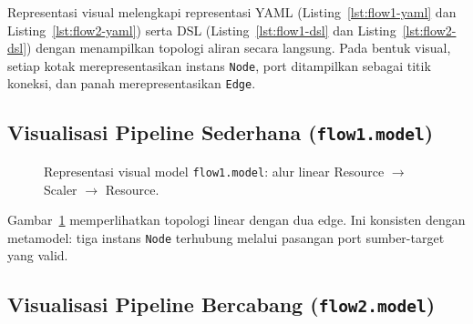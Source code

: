 Representasi visual melengkapi representasi YAML (Listing~\ref{lst:flow1-yaml} dan Listing~\ref{lst:flow2-yaml}) serta DSL (Listing~\ref{lst:flow1-dsl} dan Listing~\ref{lst:flow2-dsl}) dengan menampilkan topologi aliran secara langsung. Pada bentuk visual, setiap kotak merepresentasikan instans \texttt{Node}, port ditampilkan sebagai titik koneksi, dan panah merepresentasikan \texttt{Edge}.

\subsection{Visualisasi Pipeline Sederhana (\texttt{flow1.model})}

\begin{figure}[htbp]
\centering
{}
\caption{Representasi visual model \texttt{flow1.model}: alur linear Resource $\rightarrow$ Scaler $\rightarrow$ Resource.}
\label{fig:flow1-visual}
\end{figure}

Gambar~\ref{fig:flow1-visual} memperlihatkan topologi linear dengan dua edge. Ini konsisten dengan metamodel: tiga instans \texttt{Node} terhubung melalui pasangan port sumber-target yang valid.

\subsection{Visualisasi Pipeline Bercabang (\texttt{flow2.model})}

